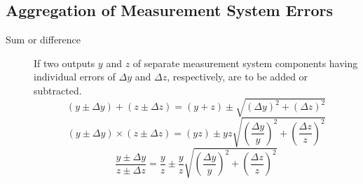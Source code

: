 \documentclass[a4paper,UTF8]{article}
\theoremstyle{mystyle}{
  \newtheorem{law}{Law}
}
\begin{document}
\subsection{Aggregation of Measurement System Errors}
\begin{description}
\item[Sum or difference]
If two outputs $y$ and $z$ of separate measurement system components
having individual errors of $\Delta y$ and $\Delta z$, respectively, are to be added or
subtracted.
\[
(y \pm \Delta y) + (z \pm \Delta z)
= (y+z) \pm \sqrt{(\Delta y)^2+(\Delta z)^2}
\]
\[
(y \pm \Delta y) \times (z \pm \Delta z)
= (yz) \pm yz
\sqrt{
\left(\frac{\Delta y}{y}\right)^2+\left(\frac{\Delta z}{z}\right)^2}
\]
\[
\frac{y \pm \Delta y}{z \pm \Delta z}
= \frac{y}{z} \pm \frac{y}{z}\sqrt{\left(\frac{\Delta y}{y}\right)^2+\left(\frac{\Delta z}{z}\right)^2}
\]
\end{description}
\end{document}
